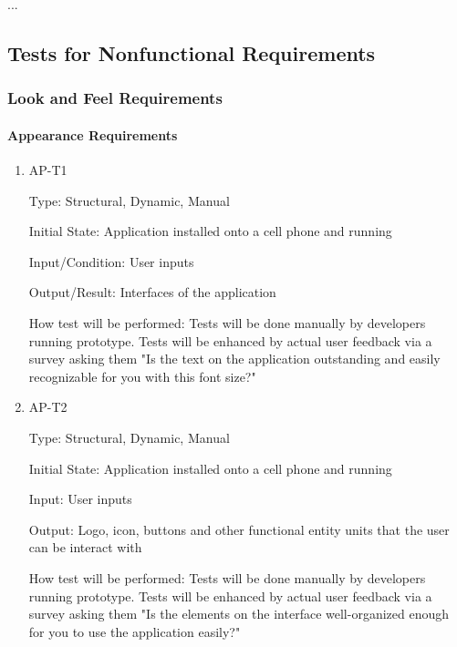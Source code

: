 \documentclass[12pt, titlepage]{article}
\begin{document}
...

\subsection{Tests for Nonfunctional Requirements}

\subsubsection{Look and Feel Requirements}
		
\paragraph{Appearance Requirements}

\begin{enumerate}

\item{AP-T1\\}

Type: Structural, Dynamic, Manual
					
Initial State: Application installed onto a cell phone and running
					
Input/Condition: User inputs
					
Output/Result: Interfaces of the application
					
How test will be performed: Tests will be done manually by developers running prototype. Tests will be enhanced by actual user feedback via a survey asking them "Is the text on the application outstanding and easily recognizable for you with this font size?"
					
\item{AP-T2\\}

Type: Structural, Dynamic, Manual
					
Initial State: Application installed onto a cell phone and running
					
Input: User inputs
					
Output: Logo, icon, buttons and other functional entity units that the user can be interact with
					
How test will be performed: Tests will be done manually by developers running prototype. Tests will be enhanced by actual user feedback via a survey asking them "Is the elements on the interface well-organized enough for you to use the application easily?"

\end{enumerate}
\end{document}

